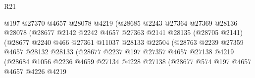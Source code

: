 \begin{lexlean}{R21}
\begin{coremodule}
                                    @197
                                    @27370
                                    @4657
                                    @28078
                                    @4219
                                    (@28685
                                      @2243
                                      @27364
                                      @27369
                                      @28136
                                      @28078
                                      (@28677
                                        @2142
                                        @2242
                                        @4657
                                        @27363
                                        @2141
                                        @28135
                                        (@28705 @2141)
                                        (@28677
                                          @2240
                                          @466
                                          @27361
                                          @11037
                                          @28133
                                          @22504
                                          (@28763
                                            @2239
                                            @27359
                                            @4657
                                            @28132
                                            @28133
                                            (@28677
                                              @2237
                                              @197
                                              @27357
                                              @4657
                                              @27138
                                              @4219
                                              (@28684
                                                @1056
                                                @2236
                                                @4659
                                                @27134
                                                @4228
                                                @27138
                                                (@28677
                                                  @574
                                                  @197
                                                  @4657
                                                  @4657
                                                  @4226
                                                  @4219

\end{coremodule}
\end{lexlean}
